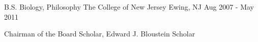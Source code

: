 \begin{cventries}
  \cventry
    {B.S. Biology, Philosophy} %
    {The College of New Jersey} %
    {Ewing, NJ} %
    {Aug 2007 - May 2011} %
    {
      \begin{cvitems} %
        \item{Chairman of the Board Scholar, Edward J. Bloustein Scholar}
      \end{cvitems}
    }
\end{cventries}
